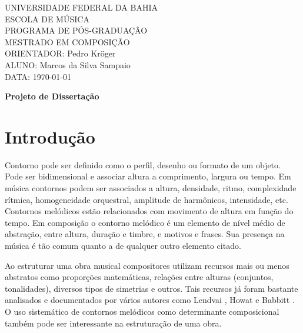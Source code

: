 \documentclass{article}
\begin{document}
\setlength{\parindent}{0cm}

\large
UNIVERSIDADE FEDERAL DA BAHIA \\
ESCOLA DE MÚSICA \\
PROGRAMA DE PÓS-GRADUAÇÃO \\
MESTRADO EM COMPOSIÇÃO \\
ORIENTADOR: Pedro Kröger \\
ALUNO: Marcos da Silva Sampaio \\
DATA: \today

\thispagestyle{empty}
\vspace{1cm}
\begin{center}
  {\Huge \textbf{Projeto de Dissertação}}
\end{center}
\vspace{1cm}

\section{Introdução}
\label{sec:introducao}

Contorno pode ser definido como o perfil, desenho ou formato de um
objeto. Pode ser bidimensional e associar altura a comprimento,
largura ou tempo. Em música contornos podem ser associados a altura,
densidade, ritmo, complexidade rítmica, homogeneidade orquestral,
amplitude de harmônicos, intensidade, etc. Contornos melódicos estão
relacionados com movimento de altura em função do tempo.
Em composição o contorno melódico é um elemento de nível médio de
abstração, entre altura, duração e timbre, e motivos e frases. Sua
presença na música é tão comum quanto a de qualquer outro elemento
citado. 


Ao estruturar uma obra musical compositores utilizam recursos mais ou
menos abstratos como proporções matemáticas, relações entre alturas
(conjuntos, tonalidades), diversos tipos de simetrias e outros. Tais
recursos já foram bastante analisados e documentados por vários
autores como Lendvai \cite{Lendvai1971}, Howat \cite{Howat1983} e
Babbitt \cite{babbitt1961ssc}. O uso sistemático de contornos
melódicos como determinante composicional também pode ser interessante
na estruturação de uma obra.

\end{document}
